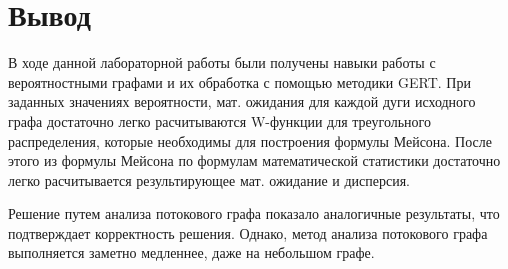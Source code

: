 \documentclass[14pt,a4paper,report]{report}
\begin{document}
\section{Вывод}

В ходе данной лабораторной работы были получены навыки работы с вероятностными графами и их обработка с помощью методики GERT. При заданных значениях вероятности, мат. ожидания для каждой дуги исходного графа достаточно легко расчитываются W-функции для треугольного распределения, которые необходимы для построения формулы Мейсона. После этого из формулы Мейсона по формулам математической статистики достаточно легко расчитывается результирующее мат. ожидание и дисперсия.

Решение путем анализа потокового графа показало аналогичные результаты, что подтверждает корректность решения. Однако, метод анализа потокового графа выполняется заметно медленнее, даже на небольшом графе.
\end{document}
